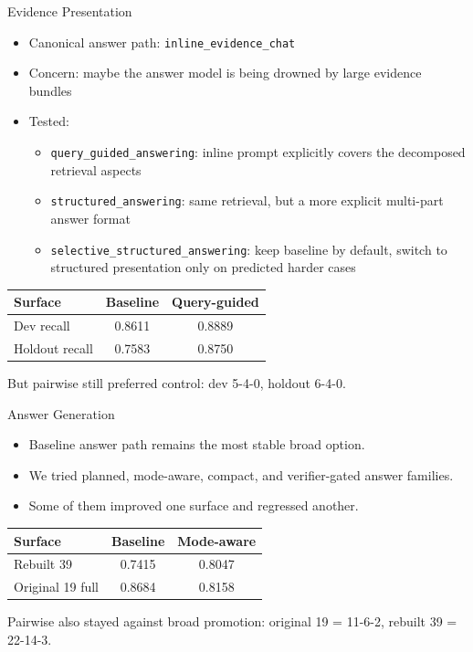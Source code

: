 \documentclass[aspectratio=169]{beamer}
\begin{document}
\begin{frame}{Evidence Presentation}
  \begin{itemize}
    \item Canonical answer path: \texttt{inline\_evidence\_chat}
    \item Concern: maybe the answer model is being drowned by large evidence bundles
    \item Tested:
      \begin{itemize}
        \item \texttt{query\_guided\_answering}: inline prompt explicitly covers the decomposed retrieval aspects
        \item \texttt{structured\_answering}: same retrieval, but a more explicit multi-part answer format
        \item \texttt{selective\_structured\_answering}: keep baseline by default, switch to structured presentation only on predicted harder cases
      \end{itemize}
  \end{itemize}

  \vspace{0.5em}
  \centering
  \begin{tabular}{lcc}
    \toprule
    Surface & Baseline & Query-guided \\
    \midrule
    Dev recall & 0.8611 & 0.8889 \\
    Holdout recall & 0.7583 & 0.8750 \\
    \bottomrule
  \end{tabular}

  \vspace{0.5em}
  But pairwise still preferred control: dev 5-4-0, holdout 6-4-0.
\end{frame}

\begin{frame}{Answer Generation}
  \begin{itemize}
    \item Baseline answer path remains the most stable broad option.
    \item We tried planned, mode-aware, compact, and verifier-gated answer families.
    \item Some of them improved one surface and regressed another.
  \end{itemize}

  \vspace{0.5em}
  \centering
  \begin{tabular}{lcc}
    \toprule
    Surface & Baseline & Mode-aware \\
    \midrule
    Rebuilt 39 & 0.7415 & 0.8047 \\
    Original 19 full & 0.8684 & 0.8158 \\
    \bottomrule
  \end{tabular}

  \vspace{0.5em}
  Pairwise also stayed against broad promotion:
  original 19 = 11-6-2, rebuilt 39 = 22-14-3.
\end{frame}
\end{document}
